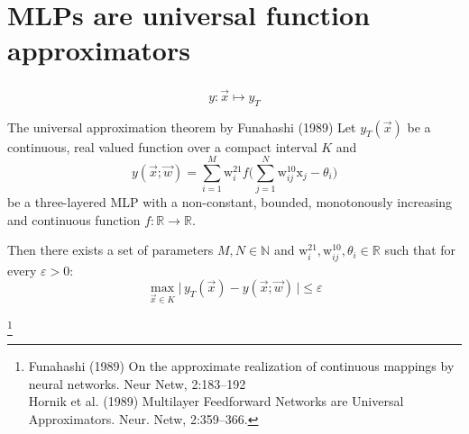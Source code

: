 \section{MLPs are universal function approximators}

\begin{frame}\frametitle{\secname}


\begin{equation}
y: \vec x \mapsto y_T
\end{equation}


   \begin{block}{The universal approximation theorem by Funahashi (1989)}
	\small
    	Let $y_T{(\vec{x})}$ be a continuous, real valued function 
    	over a compact interval $K$ and     
		\begin{equation} 
		{y}{(\vec{x}; \vec w)} = \sum_{i=1}^M \mathrm{w}_i^{21} 
		f\Big( \sum\limits_{j=1}^N \mathrm{w}_{ij}^{10} 
		  \mathrm{x}_j - \theta_i \Big)
		 \end{equation}
    	be a three-layered MLP with a non-constant, bounded, 
    	monotonously increasing and continuous function 
    	$f: \mathbb{R} \rightarrow \mathbb{R}$.\\
		\vspace{4mm}
	   \pause

		Then there exists a set of parameters 
		$M, N \in \mathbb{N}$ and $\mathrm{w}_i^{21}, 
		\mathrm{w}_{ij}^{10}, \theta_i \in \mathbb{R}$ 
		such that for every $\varepsilon > 0$:
		\begin{equation}
			\max_{\vec{x} \in K} \Big| \, y_T{(\vec{x})} - {y}{(\vec{x}; \vec w)} \,\Big| 
			\leq \varepsilon
		 \end{equation}

  \end{block}
   \footnote
	{
	 Funahashi (1989) On the approximate realization of 
		continuous mappings by neural networks. Neur Netw, 2:183--192\\
		Hornik et al. (1989) Multilayer Feedforward Networks 
		are Universal Approximators. Neur. Netw, 2:359--366.
		}
  
\end{frame}

